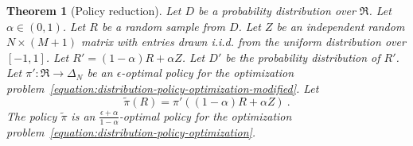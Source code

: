 \documentclass[12pt]{article}
\newcommand{\Requests}{\mathfrak{R}}
\newtheorem{theorem}{Theorem}
\theoremstyle{definition}
\begin{document}
\begin{theorem}[Policy reduction]
\label{theorem:policy-reduction}
Let $D$ be a probability distribution over $\Requests$. Let $\alpha \in (0,1)$.
Let $R$ be a random sample from $D$. Let $Z$ be an independent random $N \times
(M+1)$ matrix with entries drawn i.i.d. from the uniform distribution over
$[-1,1]$. Let $R' = (1-\alpha)R + \alpha Z$. Let $D'$ be the probability
distribution of $R'$. Let $\pi':\Requests \to \Delta_N$ be an $\epsilon$-optimal
policy for the optimization
problem~\eqref{equation:distribution-policy-optimization-modified}. Let
$$
\widetilde{\pi}(R) = \pi'((1-\alpha)R + \alpha Z) \: .
$$
The policy $\widetilde{\pi}$ is an $\frac{\epsilon + \alpha}{1-\alpha}$-optimal
policy for the optimization
problem~\eqref{equation:distribution-policy-optimization}.
\end{theorem}
\end{document}
